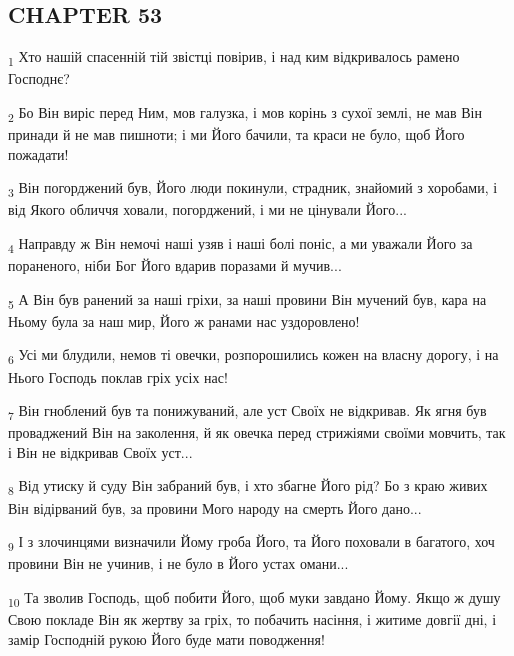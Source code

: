 \subsection{CHAPTER 53}
\begin{tcolorbox}
\textsubscript{1} Хто нашій спасенній тій звістці повірив, і над ким відкривалось рамено Господнє?
\end{tcolorbox}
\begin{tcolorbox}
\textsubscript{2} Бо Він виріс перед Ним, мов галузка, і мов корінь з сухої землі, не мав Він принади й не мав пишноти; і ми Його бачили, та краси не було, щоб Його пожадати!
\end{tcolorbox}
\begin{tcolorbox}
\textsubscript{3} Він погорджений був, Його люди покинули, страдник, знайомий з хоробами, і від Якого обличчя ховали, погорджений, і ми не цінували Його...
\end{tcolorbox}
\begin{tcolorbox}
\textsubscript{4} Направду ж Він немочі наші узяв і наші болі поніс, а ми уважали Його за пораненого, ніби Бог Його вдарив поразами й мучив...
\end{tcolorbox}
\begin{tcolorbox}
\textsubscript{5} А Він був ранений за наші гріхи, за наші провини Він мучений був, кара на Ньому була за наш мир, Його ж ранами нас уздоровлено!
\end{tcolorbox}
\begin{tcolorbox}
\textsubscript{6} Усі ми блудили, немов ті овечки, розпорошились кожен на власну дорогу, і на Нього Господь поклав гріх усіх нас!
\end{tcolorbox}
\begin{tcolorbox}
\textsubscript{7} Він гноблений був та понижуваний, але уст Своїх не відкривав. Як ягня був проваджений Він на заколення, й як овечка перед стрижіями своїми мовчить, так і Він не відкривав Своїх уст...
\end{tcolorbox}
\begin{tcolorbox}
\textsubscript{8} Від утиску й суду Він забраний був, і хто збагне Його рід? Бо з краю живих Він відірваний був, за провини Мого народу на смерть Його дано...
\end{tcolorbox}
\begin{tcolorbox}
\textsubscript{9} І з злочинцями визначили Йому гроба Його, та Його поховали в багатого, хоч провини Він не учинив, і не було в Його устах омани...
\end{tcolorbox}
\begin{tcolorbox}
\textsubscript{10} Та зволив Господь, щоб побити Його, щоб муки завдано Йому. Якщо ж душу Свою покладе Він як жертву за гріх, то побачить насіння, і житиме довгії дні, і замір Господній рукою Його буде мати поводження!
\end{tcolorbox}

